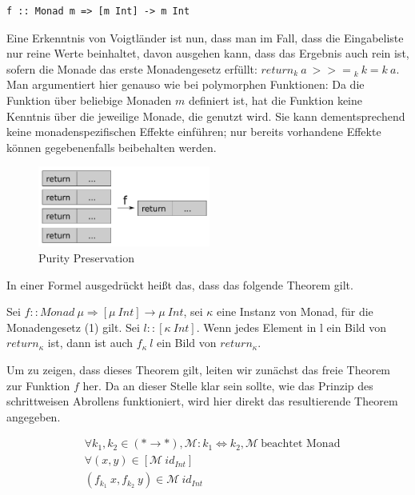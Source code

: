\begin{verbatim}
f :: Monad m => [m Int] -> m Int
\end{verbatim}

Eine Erkenntnis von Voigtländer ist nun, dass man im Fall, dass die Eingabeliste nur reine Werte beinhaltet, davon ausgehen
kann, dass das Ergebnis auch rein ist, sofern die Monade das erste Monadengesetz erfüllt: $return_k\ a\ {>>=}_k\ k = k\ a$. Man argumentiert hier genauso wie bei polymorphen Funktionen: Da die Funktion über
beliebige Monaden $m$ definiert ist, hat die Funktion keine Kenntnis über die jeweilige Monade, die genutzt wird.
Sie kann dementsprechend keine monadenspezifischen Effekte einführen; nur bereits vorhandene
Effekte können gegebenenfalls beibehalten werden.

\begin{figure}[ht]
\centering
\includegraphics[height=100px]{purity-preservation}
\caption{Purity Preservation}
\label{fig:purity-preservation}
\end{figure}

In einer Formel ausgedrückt heißt das, dass das folgende Theorem gilt.

\begin{mytheorem}
Sei $f :: Monad\ \mu \Rightarrow [\mu\ Int] \rightarrow \mu\ Int$, sei $\kappa$ eine Instanz von Monad, für die Monadengesetz (1) gilt.
Sei $l :: [\kappa\ Int]$. Wenn jedes Element in l ein Bild von $return_{\kappa}$ ist, dann ist auch $f_{\kappa}\ l$ ein Bild von $return_{\kappa}$.
\end{mytheorem}

Um zu zeigen, dass dieses Theorem gilt, leiten wir zunächst das freie Theorem zur Funktion $f$ her. Da an dieser Stelle klar sein
sollte, wie das Prinzip des schrittweisen Abrollens funktioniert, wird hier direkt das resultierende Theorem angegeben.

\begin{align*}
& \forall k_1, k_2 \in (* \rightarrow *), \mathcal{M} : k_1 \Leftrightarrow k_2, \mathcal{M}~\text{beachtet Monad} \\
& \forall (x, y) \in [\mathcal{M}\ id_{Int}] \\
& (f_{k_1}\ x, f_{k_2}\ y) \in \mathcal{M}\ id_{Int}
\end{align*}

